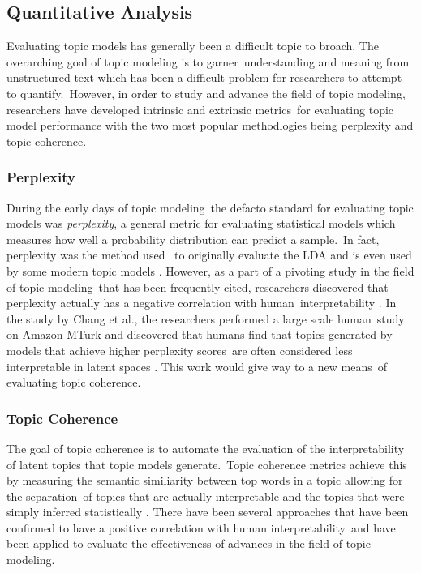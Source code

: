 \documentclass[letterpaper,12pt]{article}
\begin{document}
\subsection{Quantitative Analysis}
Evaluating topic models has generally been a difficult topic to broach. The overarching goal of topic modeling is to garner\
understanding and meaning from unstructured text which has been a difficult problem for researchers to attempt to quantify.\
However, in order to study and advance the field of topic modeling, researchers have developed intrinsic and extrinsic metrics\
for evaluating topic model performance with the two most popular methodlogies being perplexity and topic coherence.
\subsubsection{Perplexity}
During the early days of topic modeling\
the defacto standard for evaluating topic models was \emph{perplexity}, a general metric for evaluating statistical models
which measures how well a probability distribution can predict a sample.\ In fact, perplexity was the method used \	
to originally evaluate the LDA and is even used by some modern topic models \cite{kesiraju2019learning}. However, as a part of a pivoting study in the field of topic modeling\
that has been frequently cited, researchers discovered that perplexity actually has a negative correlation with human\
interpretability \cite{chang2009reading}. In the study by Chang et al., the researchers performed a large scale human\
study on Amazon MTurk and discovered that humans find that topics generated by models that achieve higher perplexity scores\
are often considered less interpretable in latent spaces \cite{chang2009reading}. This work would give way to a new means\
of evaluating topic coherence.

\subsubsection{Topic Coherence}
The goal of topic coherence is to automate the evaluation of the interpretability of latent topics that topic models generate.\
Topic coherence metrics achieve this by measuring the semantic similiarity between top words in a topic allowing for the separation\
of topics that are actually interpretable and the topics that were simply inferred statistically \cite{stevens2012exploring}.
There have been several approaches that have been confirmed to have a positive correlation with human interpretability\
and have been applied to evaluate the effectiveness of advances in the field of topic modeling.
\end{document}
